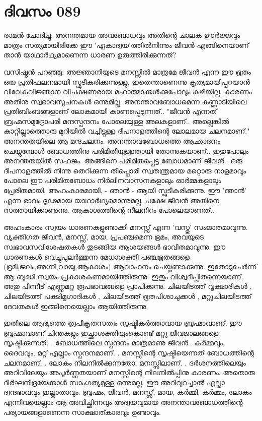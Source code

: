 \newpage
\section{ദിവസം 089}


രാമന്‍ ചോദിച്ചു: അനന്തമായ അവബോധവും അതിന്റെ ചാലക ഊര്‍ജ്ജവും മാത്രം സത്യമായിരിക്കേ ഈ 'ഏകാദ്വയ'ത്തില്‍നിന്നും ജീവന്‍ എങ്ങിനെയാണ്‌ താന്‍ യാഥാര്‍ഥ്യമാണെന്ന ധാരണ ഉരുത്തിരിക്കുന്നത്‌?

വസിഷ്ഠന്‍ പറഞ്ഞു: അജ്ഞാനിയുടെ മനസ്സില്‍ മാത്രമേ ജീവന്‍ എന്ന ഈ ഭൂതം ഒരു പ്രതിഫലനമായി സ്ഫുടീകരിക്കുന്നുള്ളു. ഇതെന്താണെന്നു കൃത്യമായിപ്പറയാന്‍ വിവേകവിജ്ഞാന വിചക്ഷണരായ മഹാത്മാക്കള്‍ക്കുപോലും കഴിയില്ല. കാരണം അതിനു സ്വഭാവസൂചനകള്‍ ഒന്നുമില്ല. അനന്താവബോധമെന്ന കണ്ണാടിയിലെ പ്രതിബിംബങ്ങളാണ്‌ ലോകമായി കാണപ്പെടുന്നത്‌..  "ജീവന്‍ എന്നത്‌ ബ്രഹ്മസമുദ്രോപരി മന്ദസ്പന്ദനം പോലെയുള്ള അലകളാണ്‌.. അല്ലെങ്കില്‍ കാറ്റില്ലാത്തൊരു മുറിയില്‍ വച്ചിട്ടുള്ള ദീപനാളത്തിന്റെ ലോലമായ ചലനമാണ്‌." അനന്തതയിലെ ആ മന്ദചലനം. അനന്താവബോധത്തെ ആഛാദനം ചെയ്യുമ്പോള്‍ ബോധത്തിനു പരിമിതിയുള്ളതായി തോന്നുകയാണ്‌.. ഇതുപോലും അനന്തതയില്‍ സഹജം. അങ്ങിനെ പരിമിതപ്പെട്ട ബോധമാണ്‌ ജീവന്‍.. ഒരു ദീപനാളത്തില്‍ നിന്നു തെറിക്കുന്ന തീപ്പൊരി സ്വതന്ത്രമായ മറ്റൊരു നാളമാവും പോലെ ഈ പരിമിതബോധം നിര്‍ലീനവാസനകളാലും ഓര്‍മ്മകളാലും പ്രേരിതമായി, അഹംകാരമായി, - ഞാന്‍ - ആയി സ്ഫുടീകരിക്കുന്നു. ഈ 'ഞാന്‍' എന്ന ഭാവം ദൃഢമായ യാഥാര്‍ഥ്യമൊന്നുമല്ല. പക്ഷേ ജീവന്‍ അതിനെ സത്തായിക്കാണുന്നു. ആകാശത്തിന്റെ നീലനിറം പോലെയാണത്‌..

അഹംകാരം സ്വയം ധാരണകളുണ്ടാക്കി മനസ്സ്‌ എന്ന 'വസ്തു' സംജാതമാവുന്നു. വ്യക്തിഗത ജീവന്‍, മനസ്സ്‌, മായ, പ്രപഞ്ചമെന്ന ഭ്രമം, അവയുടെ സ്വഭാവസവിശേഷതകള്‍ തുടങ്ങിയ ആശയങ്ങള്‍ ഭാവിതമാവുന്നു. ഈ ധാരണകള്‍ വെച്ചുപുലര്‍ത്തുന്ന മേധാശക്തി പഞ്ചഭൂതങ്ങളെ (ഭൂമി,ജലം,അഗ്നി,വായു,ആകാശം) ആവാഹനം ചെയ്തുണ്ടാക്കുന്നു. ഇതോടുചേര്‍ന്ന് ആ ബുദ്ധി സ്വയം പ്രകാശകണമായിത്തിരുന്നു. ഇതും വിശ്വദീപ്തിതന്നെയാണ്‌. അതു പിന്നീട്‌ എണ്ണമറ്റ രൂപഭാവങ്ങളെ പ്രാപിക്കുന്നു. ചിലയിടത്ത്‌ വൃക്ഷാദികള്‍ , ചിലയിടത്ത്‌ പക്ഷിമൃഗാദികള്‍ , ചിലയിടത്ത്‌ ഭൂതപിശാചുക്കള്‍ , മറ്റുചിലയിടത്ത്‌ ദേവതകള്‍ ഇങ്ങിനെയെല്ലാം ആയിത്തീരുന്നു.

ഇതിലെ ആദ്യത്തെ രൂപീകൃതസത്വം സൃഷ്ടികര്‍ത്താവായ ബ്രഹ്മാവാണ്‌. ഈ ബ്രഹ്മാവാണ്‌ ചിന്തകളും ഇച്ഛാശക്തിയുംകൊണ്ട്‌ മറ്റു ജീവജാലങ്ങളെ സൃഷ്ടിക്കുന്നത്‌. . ബോധത്തിലെ സ്പന്ദനം മാത്രമാണു ജീവന്‍.. കര്‍മ്മവും, ദൈവവും, മറ്റ്‌ എല്ലാം സ്പന്ദനമാണ്‌. . മനസ്സിന്റെ സൃഷ്ടിയെന്നത്‌ ബോധത്തിന്റെ ചലനമാണ്‌. . ലോകം നിലനില്‍ക്കുന്നതോ, മനസ്സിലാണ്‌. . ദര്‍ശനത്തിലെയും അറിവിലേയും അപൂര്‍ണ്ണതയാണ്‌ മനസ്സിന്റെ നിലനില്‍പ്പിനു കാരണം. അതൊരു ദീര്‍ഘനിദ്രയേക്കാള്‍ സാംഗത്യമുള്ള ഒന്നുമല്ല. ഈ അറിവുറച്ചാല്‍ എല്ലാ ദ്വന്ദഭാവവും ഇല്ലാതാവും. ബ്രഹ്മം, ജീവന്‍, മനസ്സ്‌, മായ, കര്‍മ്മി, കര്‍മ്മം, ലോകം എന്നിവയെല്ലാം ആ അവിച്ഛിന്നവും അദ്വയവുമായ അനന്താവബോധത്തിന്റെ പര്യായങ്ങളാണെന്ന സാക്ഷാത്കാരവും  ഉണ്ടാവും.

